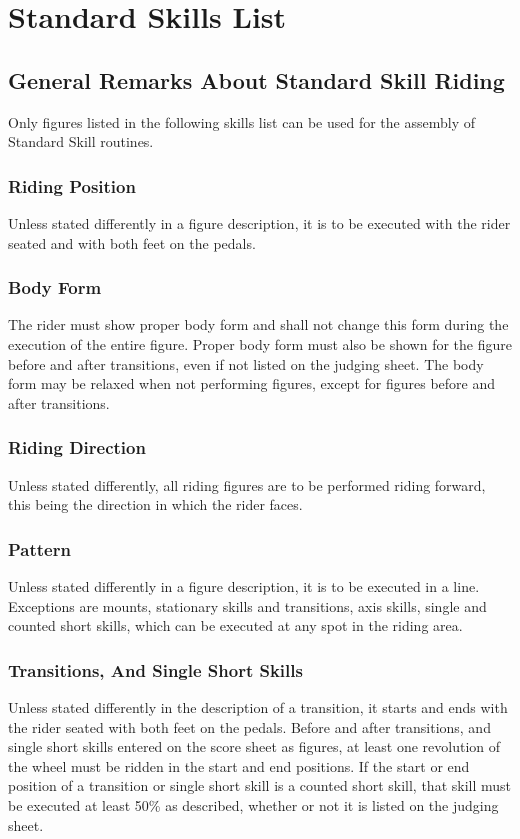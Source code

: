 \chapter{Standard Skills List}
\section{General Remarks About Standard Skill Riding  \label{sec:freestyle_std-skills-list}}
Only figures listed in the following skills list can be used for the assembly of Standard Skill routines.

\subsection{Riding Position}
Unless stated differently in a figure description, it is to be executed with the rider seated and with both feet on the pedals.

\subsection{Body Form}
The rider must show proper body form and shall not change this form during the execution of the entire figure.
Proper body form must also be shown for the figure before and after transitions, even if not listed on the judging sheet.
The body form may be relaxed when not performing figures, except for figures before and after transitions.

\subsection{Riding Direction}
Unless stated differently, all riding figures are to be performed riding forward, this being the direction in which the rider faces.

\subsection{Pattern}
Unless stated differently in a figure description, it is to be executed in a line.
Exceptions are mounts, stationary skills and transitions, axis skills, single and counted short skills, which can be executed at any spot in the riding area.

\subsection{Transitions, And Single Short Skills}
Unless stated differently in the description of a transition, it starts and ends with the rider seated with both feet on the pedals.
Before and after transitions, and single short skills entered on the score sheet as figures, at least one revolution of the wheel must be ridden in the start and end positions.
If the start or end position of a transition or single short skill is a counted short skill, that skill must be executed at least 50\% as described, whether or not it is listed on the judging sheet.

